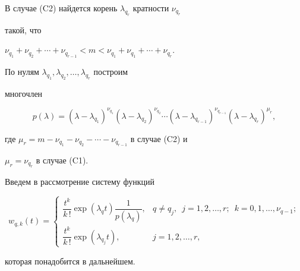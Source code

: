  


В случае (C2) найдется корень $\lambda_{q_r}$ кратности $\nu_{q_r}$ 


такой, что 


$\nu_{q_1}+\nu_{q_2}+\dotsb+\nu_{q_{r-1}}<m<\nu_{q_1}+ 


\nu_{q_1}+\dotsb+\nu_{q_r}$. 


 


По нулям $\lambda_{q_1},\lambda_{q_2},\dotsc,\lambda_{q_r}$ построим 


многочлен 


$$ 


p(\lambda)=(\lambda-\lambda_{q_1})^{\nu_{q_1}} 


(\lambda-\lambda_{q_2})^{\nu_{q_2}}\dotsb 


(\lambda-\lambda_{q_{r-1}})^{\nu_{q_{r-1}}} 


(\lambda-\lambda_{q_r})^{\mu_r}, 


$$ 


где $\mu_r=m-\nu_{q_1}-\nu_{q_2}-\dotsb-\nu_{q_{r-1}}$ в случае (C2) и 


$\mu_r=\nu_{q_r}$ в случае (C1). 


 


Введем в рассмотрение систему функций 


\begin{equation} 


\label{12} 


w_{q,k}(t)= 


\begin{cases} 


\dfrac{t^k}{k\,!}\exp(\lambda_q t)\dfrac{1}{p(\lambda_q)},& 


q\ne q_j,\ \; j=1,2,\dotsc,r;\ \;k=0,1,\dotsc,\nu_{q-1}; \\ 


\dfrac{t^k}{k\,!}\exp(\lambda_{q_j}t),& j=1,2,\dotsc,r, 


\end{cases} 


\end{equation} 


которая понадобится в дальнейшем. 


 


